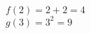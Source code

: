 \documentclass[varwidth,convert={density=2000,size=2000x,outext=.png}]{standalone}
\begin{document}
$f(2)=2+2=4$
\\
$g(3)=3^2=9$
\end{document}

